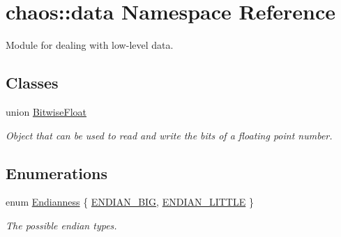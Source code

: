 \hypertarget{namespacechaos_1_1data}{\section{chaos\-:\-:data Namespace Reference}
\label{namespacechaos_1_1data}
}


Module for dealing with low-\/level data.  


\subsection*{Classes}
\begin{DoxyCompactItemize}
\item 
union \hyperlink{unionchaos_1_1data_1_1_bitwise_float}{Bitwise\-Float}
\begin{DoxyCompactList}\small\item\em Object that can be used to read and write the bits of a floating point number. \end{DoxyCompactList}\end{DoxyCompactItemize}
\subsection*{Enumerations}
\begin{DoxyCompactItemize}
\item 
enum \hyperlink{namespacechaos_1_1data_adb2657d50c0b84cdc1153001031bbf3f}{Endianness} \{ \hyperlink{namespacechaos_1_1data_adb2657d50c0b84cdc1153001031bbf3fa0e1ed99b965cedefe24534be309738ad}{E\-N\-D\-I\-A\-N\-\_\-\-B\-I\-G}, 
\hyperlink{namespacechaos_1_1data_adb2657d50c0b84cdc1153001031bbf3fa7fc5455bb6147c278dfa4a84e255c66d}{E\-N\-D\-I\-A\-N\-\_\-\-L\-I\-T\-T\-L\-E}
 \}
\begin{DoxyCompactList}\small\item\em The possible endian types. \end{DoxyCompactList}\end{DoxyCompactItemize}
